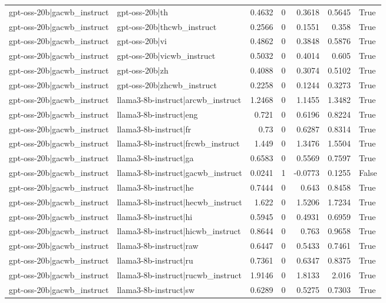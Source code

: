 \begin{table}
\begin{tabular}{l l r r r r l}
gpt-oss-20b|gacwb_instruct & gpt-oss-20b|th & 0.4632 & 0 & 0.3618 & 0.5645 & True \\
gpt-oss-20b|gacwb_instruct & gpt-oss-20b|thcwb_instruct & 0.2566 & 0 & 0.1551 & 0.358 & True \\
gpt-oss-20b|gacwb_instruct & gpt-oss-20b|vi & 0.4862 & 0 & 0.3848 & 0.5876 & True \\
gpt-oss-20b|gacwb_instruct & gpt-oss-20b|vicwb_instruct & 0.5032 & 0 & 0.4014 & 0.605 & True \\
gpt-oss-20b|gacwb_instruct & gpt-oss-20b|zh & 0.4088 & 0 & 0.3074 & 0.5102 & True \\
gpt-oss-20b|gacwb_instruct & gpt-oss-20b|zhcwb_instruct & 0.2258 & 0 & 0.1244 & 0.3273 & True \\
gpt-oss-20b|gacwb_instruct & llama3-8b-instruct|arcwb_instruct & 1.2468 & 0 & 1.1455 & 1.3482 & True \\
gpt-oss-20b|gacwb_instruct & llama3-8b-instruct|eng & 0.721 & 0 & 0.6196 & 0.8224 & True \\
gpt-oss-20b|gacwb_instruct & llama3-8b-instruct|fr & 0.73 & 0 & 0.6287 & 0.8314 & True \\
gpt-oss-20b|gacwb_instruct & llama3-8b-instruct|frcwb_instruct & 1.449 & 0 & 1.3476 & 1.5504 & True \\
gpt-oss-20b|gacwb_instruct & llama3-8b-instruct|ga & 0.6583 & 0 & 0.5569 & 0.7597 & True \\
gpt-oss-20b|gacwb_instruct & llama3-8b-instruct|gacwb_instruct & 0.0241 & 1 & -0.0773 & 0.1255 & False \\
gpt-oss-20b|gacwb_instruct & llama3-8b-instruct|he & 0.7444 & 0 & 0.643 & 0.8458 & True \\
gpt-oss-20b|gacwb_instruct & llama3-8b-instruct|hecwb_instruct & 1.622 & 0 & 1.5206 & 1.7234 & True \\
gpt-oss-20b|gacwb_instruct & llama3-8b-instruct|hi & 0.5945 & 0 & 0.4931 & 0.6959 & True \\
gpt-oss-20b|gacwb_instruct & llama3-8b-instruct|hicwb_instruct & 0.8644 & 0 & 0.763 & 0.9658 & True \\
gpt-oss-20b|gacwb_instruct & llama3-8b-instruct|raw & 0.6447 & 0 & 0.5433 & 0.7461 & True \\
gpt-oss-20b|gacwb_instruct & llama3-8b-instruct|ru & 0.7361 & 0 & 0.6347 & 0.8375 & True \\
gpt-oss-20b|gacwb_instruct & llama3-8b-instruct|rucwb_instruct & 1.9146 & 0 & 1.8133 & 2.016 & True \\
gpt-oss-20b|gacwb_instruct & llama3-8b-instruct|sw & 0.6289 & 0 & 0.5275 & 0.7303 & True \\

\end{tabular}
\end{table}
